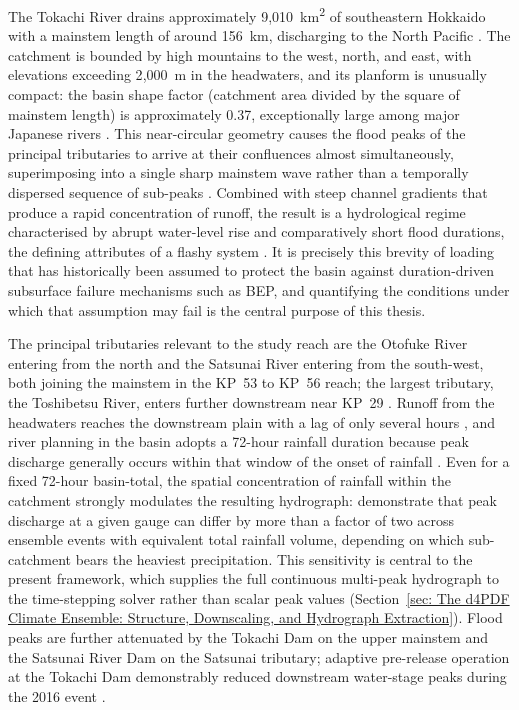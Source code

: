 The Tokachi River drains approximately 9{,}010~km\textsuperscript{2} of southeastern Hokkaido with a mainstem length of around 156~km, discharging to the North Pacific \parencite{kimura_2018}. The catchment is bounded by high mountains to the west, north, and east, with elevations exceeding 2{,}000~m in the headwaters, and its planform is unusually compact: the basin shape factor (catchment area divided by the square of mainstem length) is approximately 0.37, exceptionally large among major Japanese rivers \parencite{fukuoka_2019}. This near-circular geometry causes the flood peaks of the principal tributaries to arrive at their confluences almost simultaneously, superimposing into a single sharp mainstem wave rather than a temporally dispersed sequence of sub-peaks \parencite{fukuoka_2019, kimura_2018}. Combined with steep channel gradients that produce a rapid concentration of runoff, the result is a hydrological regime characterised by abrupt water-level rise and comparatively short flood durations, the defining attributes of a flashy system \parencite{kyuka_2020}. It is precisely this brevity of loading that has historically been assumed to protect the basin against duration-driven subsurface failure mechanisms such as BEP, and quantifying the conditions under which that assumption may fail is the central purpose of this thesis.

The principal tributaries relevant to the study reach are the Otofuke River entering from the north and the Satsunai River entering from the south-west, both joining the mainstem in the KP~53 to KP~56 reach; the largest tributary, the Toshibetsu River, enters further downstream near KP~29 \parencite{hoshino2023spatiotemporal, fukuoka_2019}. Runoff from the headwaters reaches the downstream plain with a lag of only several hours \parencite{kimura_2018}, and river planning in the basin adopts a 72-hour rainfall duration because peak discharge generally occurs within that window of the onset of rainfall \parencite{hoshino2023spatiotemporal}. Even for a fixed 72-hour basin-total, the spatial concentration of rainfall within the catchment strongly modulates the resulting hydrograph: \textcite{hoshino2023spatiotemporal} demonstrate that peak discharge at a given gauge can differ by more than a factor of two across ensemble events with equivalent total rainfall volume, depending on which sub-catchment bears the heaviest precipitation. This sensitivity is central to the present framework, which supplies the full continuous multi-peak hydrograph to the time-stepping solver rather than scalar peak values (Section~\ref{sec: The d4PDF Climate Ensemble: Structure, Downscaling, and Hydrograph Extraction}). Flood peaks are further attenuated by the Tokachi Dam on the upper mainstem and the Satsunai River Dam on the Satsunai tributary; adaptive pre-release operation at the Tokachi Dam demonstrably reduced downstream water-stage peaks during the 2016 event \parencite{kimura_2018}.

